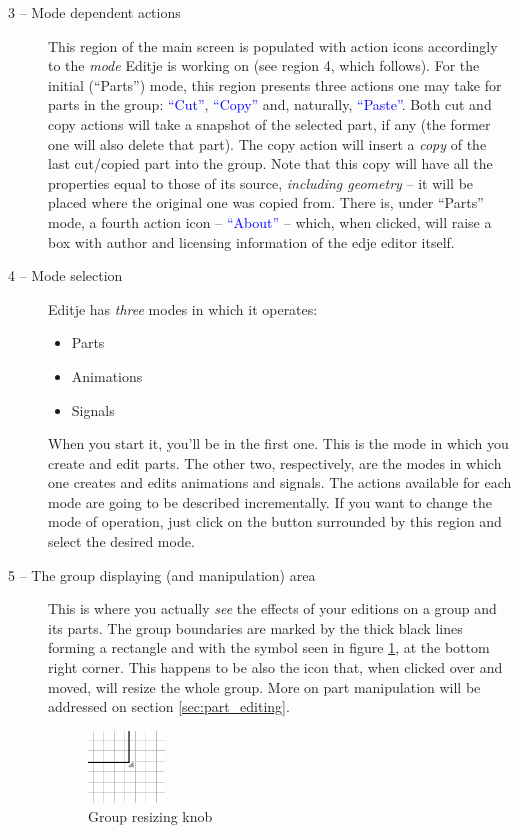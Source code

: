 \documentclass[a4paper]{profusion}
\newcommand{\GUIIcon}[1]{\textcolor{blue}{#1}}    %
\begin{document}
\begin{description}
\item[3 -- Mode dependent actions] This region of the main screen is
  populated with action icons accordingly to the \emph{mode} Editje is
  working on (see region 4, which follows). For the initial
  (``Parts'') mode, this region presents three actions one may take
  for parts in the group: \GUIIcon{``Cut''}, \GUIIcon{``Copy''} and,
  naturally, \GUIIcon{``Paste''}. Both cut and copy actions will take
  a snapshot of the selected part, if any (the former one will also
  delete that part). The copy action will insert a \emph{copy} of the
  last cut/copied part into the group. Note that this copy will have
  all the properties equal to those of its source, \emph{including
    geometry} -- it will be placed where the original one was copied
  from. There is, under ``Parts'' mode, a fourth action icon --
  \GUIIcon{``About''} -- which, when clicked, will raise a box with
  author and licensing information of the edje editor itself.

\item[4 -- Mode selection] Editje has \emph{three} modes in which it
  operates:
  \begin{itemize}
  \item Parts
  \item Animations
  \item Signals
  \end{itemize}
  When you start it, you'll be in the first one. This is the mode in
  which you create and edit parts. The other two, respectively, are
  the modes in which one creates and edits animations and signals. The
  actions available for each mode are going to be described
  incrementally. If you want to change the mode of operation, just
  click on the button surrounded by this region and select the desired
  mode.

\item[5 -- The group displaying (and manipulation) area] This is where
  you actually \emph{see} the effects of your editions on a group and
  its parts. The group boundaries are marked by the thick black lines
  forming a rectangle and with the symbol seen in figure
  \ref{fig:group_edje}, at the bottom right corner. This happens to be
  also the icon that, when clicked over and moved, will resize the
  whole group. More on part manipulation will be addressed on section
  \ref{sec:part_editing}.

\begin{figure}[h!]
  \centering
  \includegraphics[width=0.2\textwidth]{images/group_edje.png}
  \caption{Group resizing knob}
  \label{fig:group_edje}
\end{figure}


\end{description}
\end{document}
